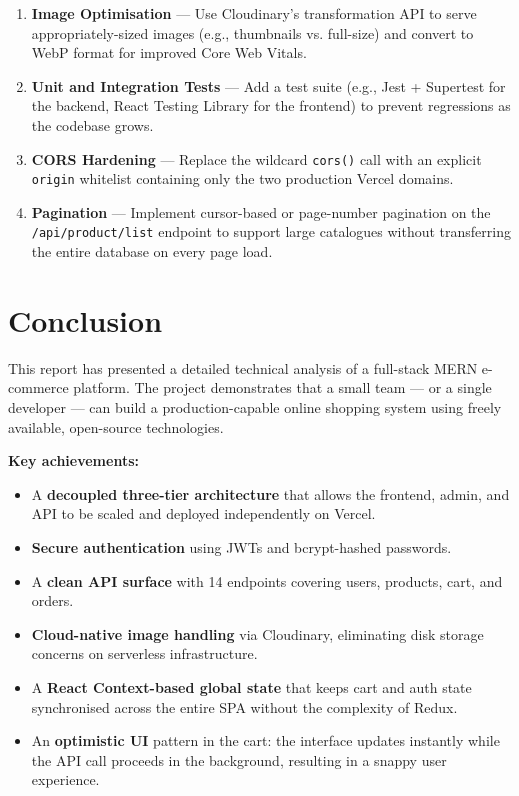 \documentclass[12pt,a4paper]{report}
\begin{document}
\begin{enumerate}[leftmargin=*, label=\arabic*.]
  \item \textbf{Image Optimisation} — Use Cloudinary's transformation API to serve
        appropriately-sized images (e.g., thumbnails vs. full-size) and convert to WebP format
        for improved Core Web Vitals.

  \item \textbf{Unit and Integration Tests} — Add a test suite (e.g., Jest + Supertest for the
        backend, React Testing Library for the frontend) to prevent regressions as the codebase
        grows.

  \item \textbf{CORS Hardening} — Replace the wildcard \texttt{cors()} call with an explicit
        \texttt{origin} whitelist containing only the two production Vercel domains.

  \item \textbf{Pagination} — Implement cursor-based or page-number pagination on the
        \texttt{/api/product/list} endpoint to support large catalogues without transferring
        the entire database on every page load.
\end{enumerate}

\chapter{Conclusion}

This report has presented a detailed technical analysis of a full-stack MERN e-commerce platform.
The project demonstrates that a small team — or a single developer — can build a production-capable
online shopping system using freely available, open-source technologies.

\textbf{Key achievements:}
\begin{itemize}[leftmargin=*, label=\checkmark]
  \item A \textbf{decoupled three-tier architecture} that allows the frontend, admin, and API to be
        scaled and deployed independently on Vercel.
  \item \textbf{Secure authentication} using JWTs and bcrypt-hashed passwords.
  \item A \textbf{clean API surface} with 14 endpoints covering users, products, cart, and orders.
  \item \textbf{Cloud-native image handling} via Cloudinary, eliminating disk storage concerns on
        serverless infrastructure.
  \item A \textbf{React Context-based global state} that keeps cart and auth state synchronised
        across the entire SPA without the complexity of Redux.
  \item An \textbf{optimistic UI} pattern in the cart: the interface updates instantly while the
        API call proceeds in the background, resulting in a snappy user experience.
\end{itemize}
\end{document}
